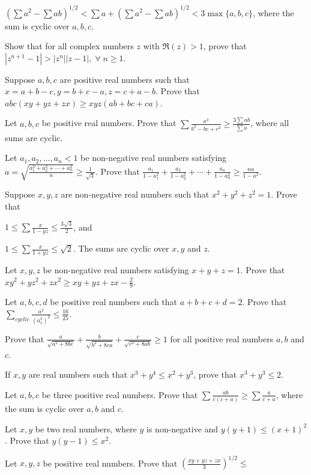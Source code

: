   $\left(\sum a^2 - \sum
  ab\right)^{1/2} < \sum a + \left(\sum a^2 - \sum ab\right)^{1/2} < 3\max\{a, b, c\}$, where the sum is cyclic
  over $a, b, c$.
\item Show that for all complex numbers $z$ with $\Re(z) > 1$, prove that $|z^{n + 1} - 1| > |z^n||z -
  1|,\;\forall\;n\geq 1$.
\item Suppose $a, b, c$ are positive real numbers such that $x = a + b - c, y = b + c - a, z = c + a - b$. Prove
  that $abc(xy + yz + zx)\geq xyz(ab + bc + ca)$.
\item Let $a, b, c$ be positive real numbers. Prove that $\displaystyle\sum\frac{a^3}{b^2 - bc + c^2}\geq
  \frac{3\sum ab}{\sum a}$, where all sums are cyclic.
\item Let $a_1, a_2, \ldots, a_n < 1$ be non-negative real numbers satisfying $a = \sqrt{\frac{a_1^2 + a_2^2 +
    \cdots + a_n^2}{n}}\geq \frac{1}{\sqrt{3}}$. Prove that $\frac{a_1}{1 - a_1^2} + \frac{a_2}{1 - a_2^2} + \cdots
  + \frac{a_n}{1 - a_n^2}\geq \frac{na}{1 - a^2}$.
\item Suppose $x, y, z$ are non-negative real numbers such that $x^2 + y^2 + z^2 = 1$. Prove that
  \startitemize[n]
  \item $1\leq \sum\frac{x}{1 - yz}\leq\frac{3\sqrt{3}}{2}$, and
  \item $1\leq \sum\frac{x}{1 + yz}\leq \sqrt{2}$.
  \stopitemize
  The sums are cyclic over $x, y$ and $z$.
\item Let $x, y, z$ be non-negative real numbers satisfying $x + y + z = 1$. Prove that $xy^2 + yz^2 + zx^2 \geq xy
  + yz + zx - \frac{2}{9}$.
\item Let $a, b, c, d$ be positive real numbers such that $a + b + c + d = 2$. Prove that
  $\displaystyle\sum_{cyclic}\frac{a^2}{(a^2 _ 1)^2}\leq \frac{16}{25}$.
\item Prove that $\frac{a}{\sqrt{a^2 + 8bc}} + \frac{b}{\sqrt{b^2 + 8ca}} + \frac{c}{\sqrt{c^2 + 8ab}}\geq 1$ for
  all positive real numbers $a, b$ and $c$.
\item If $x, y$ are real numbers such that $x^3 + y^4 \leq x^2 + y^3$, prove that $x^3 + y^3\leq 2$.
\item Let $a, b, c$ be three positive real numbers. Prove that $\sum \frac{ab}{c(c + a)}\geq\sum\frac{a}{c + a}$,
  where the sum is cyclic over $a, b$ and $c$.
\item Let $x, y$ be two real numbers, where $y$ is non-negative and $y(y + 1)\leq (x + 1)^2$. Prove that $y(y -
  1)\leq x^2$.
\item Let $x, y, z$ be positive real numbers. Prove that $\left(\frac{xy + yz + zx}{3}\right)^{1/2}\leq$

